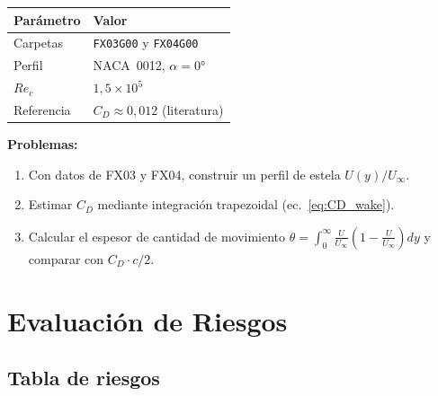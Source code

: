 \documentclass[12pt,a4paper]{article}
\begin{document}
\begin{table}[H]
	\centering
	\begin{tabular}{ll}
		\toprule
		\textbf{Parámetro} & \textbf{Valor}                      \\
		\midrule
		Carpetas           & \texttt{FX03G00} y \texttt{FX04G00} \\
		Perfil             & NACA~0012, $\alpha = 0°$            \\
		$Re_c$             & $1{,}5\times10^5$                   \\
		Referencia         & $C_D \approx 0{,}012$ (literatura)  \\
		\bottomrule
	\end{tabular}
\end{table}

\textbf{Problemas:}
\begin{enumerate}
	\item[D.1] Con datos de FX03 y FX04, construir un perfil de estela
	      $U(y)/U_\infty$.
	\item[D.2] Estimar $C_D$ mediante integración trapezoidal
	      (ec.~\eqref{eq:CD_wake}).
	\item[D.3] Calcular el espesor de cantidad de movimiento
	      $\theta = \int_0^\infty \frac{U}{U_\infty}
		      \left(1 - \frac{U}{U_\infty}\right)dy$
	      y comparar con $C_D \cdot c / 2$.
\end{enumerate}

\section{Evaluación de Riesgos}
\label{sec:riesgos}

\subsection{Tabla de riesgos}
\end{document}
